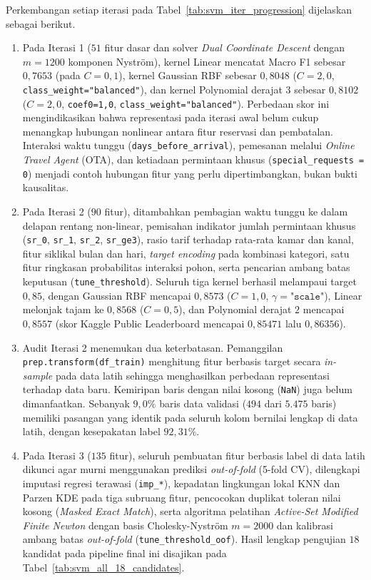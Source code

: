 Perkembangan setiap iterasi pada Tabel~\ref{tab:svm_iter_progression} dijelaskan sebagai berikut.
\begin{enumerate}
    \item Pada Iterasi 1 ($51$ fitur dasar dan solver \textit{Dual Coordinate Descent} dengan $m=1200$ komponen Nystr\"om), kernel Linear mencatat Macro F1 sebesar $0{,}7653$ (pada $C=0{,}1$), kernel Gaussian RBF sebesar $0{,}8048$ ($C=2{,}0$, \texttt{class\_weight="balanced"}), dan kernel Polynomial derajat $3$ sebesar $0{,}8102$ ($C=2{,}0$, \texttt{coef0=1,0}, \texttt{class\_weight="balanced"}). Perbedaan skor ini mengindikasikan bahwa representasi pada iterasi awal belum cukup menangkap hubungan nonlinear antara fitur reservasi dan pembatalan. Interaksi waktu tunggu (\texttt{days\_before\_arrival}), pemesanan melalui \textit{Online Travel Agent} (OTA), dan ketiadaan permintaan khusus (\texttt{special\_requests = 0}) menjadi contoh hubungan fitur yang perlu dipertimbangkan, bukan bukti kausalitas.
    \item Pada Iterasi 2 ($90$ fitur), ditambahkan pembagian waktu tunggu ke dalam delapan rentang non-linear, pemisahan indikator jumlah permintaan khusus (\texttt{sr\_0}, \texttt{sr\_1}, \texttt{sr\_2}, \texttt{sr\_ge3}), rasio tarif terhadap rata-rata kamar dan kanal, fitur siklikal bulan dan hari, \textit{target encoding} pada kombinasi kategori, satu fitur ringkasan probabilitas interaksi pohon, serta pencarian ambang batas keputusan (\texttt{tune\_threshold}). Seluruh tiga kernel berhasil melampaui target $0{,}85$, dengan Gaussian RBF mencapai $0{,}8573$ ($C=1{,}0$, $\gamma=\texttt{"scale"}$), Linear melonjak tajam ke $0{,}8568$ ($C=0{,}5$), dan Polynomial derajat $2$ mencapai $0{,}8557$ (skor Kaggle Public Leaderboard mencapai $0{,}85471$ lalu $0{,}86356$).
    \item Audit Iterasi 2 menemukan dua keterbatasan. Pemanggilan \texttt{prep.transform(df\_train)} menghitung fitur berbasis target secara \textit{in-sample} pada data latih sehingga menghasilkan perbedaan representasi terhadap data baru. Kemiripan baris dengan nilai kosong (\texttt{NaN}) juga belum dimanfaatkan. Sebanyak $9{,}0\%$ baris data validasi ($494$ dari $5.475$ baris) memiliki pasangan yang identik pada seluruh kolom bernilai lengkap di data latih, dengan kesepakatan label $92{,}31\%$.
    \item Pada Iterasi 3 ($135$ fitur), seluruh pembuatan fitur berbasis label di data latih dikunci agar murni menggunakan prediksi \textit{out-of-fold} (5-fold CV), dilengkapi imputasi regresi terawasi (\texttt{imp\_*}), kepadatan lingkungan lokal KNN dan Parzen KDE pada tiga subruang fitur, pencocokan duplikat toleran nilai kosong (\textit{Masked Exact Match}), serta algoritma pelatihan \textit{Active-Set Modified Finite Newton} dengan basis Cholesky-Nystr\"om $m=2000$ dan kalibrasi ambang batas \textit{out-of-fold} (\texttt{tune\_threshold\_oof}). Hasil lengkap pengujian $18$ kandidat pada pipeline final ini disajikan pada Tabel~\ref{tab:svm_all_18_candidates}.
\end{enumerate}

